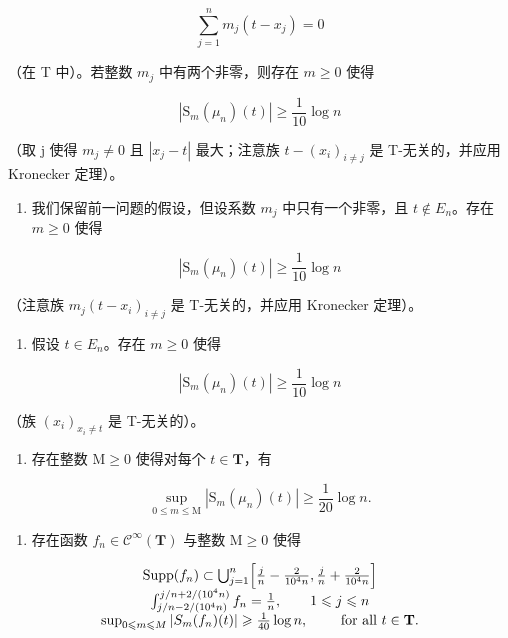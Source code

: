 \[
\sum_ {j = 1} ^ {n} m _ {j} (t - x _ {j}) = 0
\]

（在 T 中）。若整数 \(m_{j}\) 中有两个非零，则存在 \(m \geqslant 0\) 使得

\[
| \mathrm{S} _ {m} (\mu_ {n}) (t) | \geqslant \frac {1}{1 0} \log n
\]

（取 j 使得 \(m_{j} \neq 0\) 且 \(|x_{j} - t|\) 最大；注意族 \(t - (x_{i})_{i \neq j}\) 是 T-无关的，并应用 Kronecker 定理）。

\begin{enumerate}
\def\labelenumi{\alph{enumi})}
\setcounter{enumi}{4}
\tightlist
\item
  我们保留前一问题的假设，但设系数 \(m_{j}\) 中只有一个非零，且 \(t \notin E_{n}\)。存在 \(m \geqslant 0\) 使得
\end{enumerate}

\[
| \mathrm{S} _ {m} (\mu_ {n}) (t) | \geqslant \frac {1}{1 0} \log n
\]

（注意族 \(m_{j}(t - x_{i})_{i \neq j}\) 是 T-无关的，并应用 Kronecker 定理）。

\begin{enumerate}
\def\labelenumi{\alph{enumi})}
\setcounter{enumi}{5}
\tightlist
\item
  假设 \(t \in E_{n}\)。存在 \(m \geqslant 0\) 使得
\end{enumerate}

\[
| \mathrm{S} _ {m} (\mu_ {n}) (t) | \geqslant \frac {1}{1 0} \log n
\]

（族 \((x_{i})_{x_{i}\neq t}\) 是 T-无关的）。

\begin{enumerate}
\def\labelenumi{\alph{enumi})}
\setcounter{enumi}{6}
\tightlist
\item
  存在整数 \(\mathrm{M} \geqslant 0\) 使得对每个 \(t \in \mathbf{T}\)，有
\end{enumerate}

\[
\sup _ {0 \leqslant m \leqslant \mathrm{M}} | \mathrm{S} _ {m} (\mu_ {n}) (t) | \geqslant \frac {1}{2 0} \log n.
\]

\begin{enumerate}
\def\labelenumi{\alph{enumi})}
\setcounter{enumi}{7}
\tightlist
\item
  存在函数 \(f_{n}\in\mathcal{C}^{\infty}(\mathbf{T})\) 与整数 \(\mathrm{M}\geqslant0\) 使得
\end{enumerate}

\[
\begin{array}{c} \operatorname{Supp} (f _ {n}) \subset \bigcup_ {j = 1} ^ {n} \Bigl [ \frac {j}{n} - \frac {2}{1 0 ^ {4} n}, \frac {j}{n} + \frac {2}{1 0 ^ {4} n} \Bigr ] \\ \int_ {j / n - 2 / (1 0 ^ {4} n)} ^ {j / n + 2 / (1 0 ^ {4} n)} f _ {n} = \frac {1}{n}, \qquad 1 \leqslant j \leqslant n \\ \sup _ {0 \leqslant m \leqslant M} | S _ {m} (f _ {n}) (t) | \geqslant \frac {1}{4 0} \log n, \qquad \text { for all } t \in \mathbf {T}. \end{array}
\]


